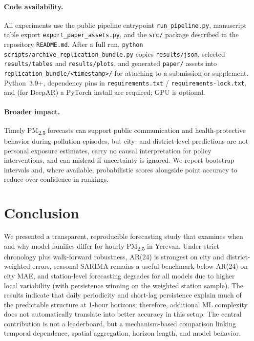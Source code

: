 \documentclass[11pt,a4paper]{article}
\begin{document}
\paragraph{Code availability.}
All experiments use the public pipeline entrypoint \texttt{run\_pipeline.py}, manuscript table export \texttt{export\_paper\_assets.py}, and the \texttt{src/} package described in the repository \texttt{README.md}. After a full run, \texttt{python scripts/archive\_replication\_bundle.py} copies \texttt{results/json}, selected \texttt{results/tables} and \texttt{results/plots}, and generated \texttt{paper/} assets into \texttt{replication\_bundle/<timestamp>/} for attaching to a submission or supplement. Python~3.9+, dependency pins in \texttt{requirements.txt} / \texttt{requirements-lock.txt}, and (for DeepAR) a PyTorch install are required; GPU is optional.

\paragraph{Broader impact.}
Timely PM\textsubscript{2.5} forecasts can support public communication and health-protective behavior during pollution episodes, but city- and district-level predictions are not personal exposure estimates, carry no causal interpretation for policy interventions, and can mislead if uncertainty is ignored. We report bootstrap intervals and, where available, probabilistic scores alongside point accuracy to reduce over-confidence in rankings.

\section{Conclusion}
\label{sec:conclusion}

We presented a transparent, reproducible forecasting study that examines when and why model families differ for hourly PM\textsubscript{2.5} in Yerevan. Under strict chronology plus walk-forward robustness, AR(24) is strongest on city and district-weighted errors, seasonal SARIMA remains a useful benchmark below AR(24) on city MAE, and station-level forecasting degrades for all models due to higher local variability (with persistence winning on the weighted station sample). The results indicate that daily periodicity and short-lag persistence explain much of the predictable structure at 1-hour horizons; therefore, additional ML complexity does not automatically translate into better accuracy in this setup. The central contribution is not a leaderboard, but a mechanism-based comparison linking temporal dependence, spatial aggregation, horizon length, and model behavior.
\end{document}
